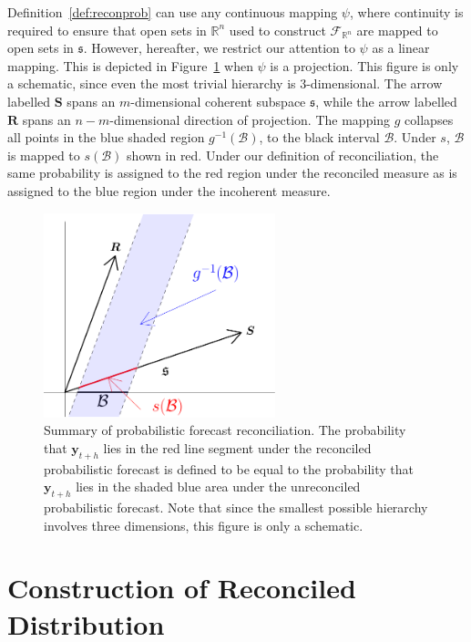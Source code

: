 \documentclass[12pt]{article}
\theoremstyle{definition}
\begin{document}
Definition~\ref{def:reconprob} can use any continuous mapping $\psi$, where continuity is required to ensure that open sets in $\mathbb{R}^n$ used to construct $\mathscr{F}_{\mathbb{R}^n}$ are mapped to open sets in $\mathfrak{s}$.  However, hereafter, we restrict our attention to $\psi$ as a linear mapping.  This is depicted in Figure~\ref{fig:probfr_sch} when $\psi$ is a projection.  This figure is only a schematic, since even the most trivial hierarchy is $3$-dimensional.  The arrow labelled $\bm{S}$ spans an $m$-dimensional coherent subspace $\mathfrak{s}$, while the arrow labelled $\bm{R}$ spans an $n-m$-dimensional direction of projection.  The mapping $g$ collapses all points in the blue shaded region $g^{-1}(\mathcal{B})$, to the black interval $\mathcal{B}$. Under $s$, $\mathcal{B}$ is mapped to $s(\mathcal{B})$ shown in red.  Under our definition of reconciliation, the same probability is assigned to the red region under the reconciled measure as is assigned to the blue region under the incoherent measure.

\begin{figure}
	\centering \includegraphics[width=0.6\textwidth]{Figs/probforerec_schematic-crop.pdf}
	\caption{Summary of probabilistic forecast reconciliation. The probability that $\bm{y}_{t+h}$ lies in the red line segment under the reconciled probabilistic forecast is defined to be equal to the probability that $\bm{y}_{t+h}$ lies in the shaded blue area under the unreconciled probabilistic forecast. Note that since the smallest possible hierarchy involves three dimensions, this figure is only a schematic.}\label{fig:probfr_sch}
\end{figure}

\section{Construction of Reconciled Distribution} \label{sec:AnalyticalSolution}
\end{document}
